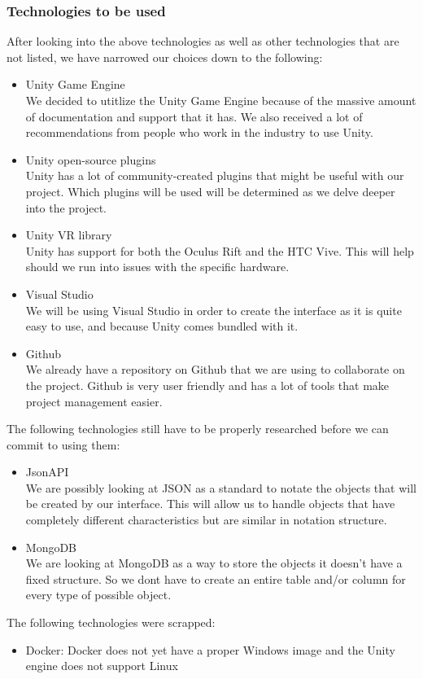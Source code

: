 	\subsubsection{Technologies to be used}
		After looking into the above technologies as well as other technologies that are not listed, we have narrowed our choices down to the following:
		\begin{itemize}
			\item Unity Game Engine \\
			We decided to utitlize the Unity Game Engine because of the massive amount of documentation and support that it has. We also received a lot of recommendations from people who work in the industry to use Unity.\\

			\item Unity open-source plugins \\
			Unity has a lot of community-created plugins that might be useful with our project. Which plugins will be used will be determined as we delve deeper into the project. \\

			\item Unity VR library \\
			Unity has support for both the Oculus Rift and the HTC Vive. This will help should we run into issues with the specific hardware. \\

			\item Visual Studio \\
			We will be using Visual Studio in order to create the interface as it is quite easy to use, and because Unity comes bundled with it. \\

			\item Github \\
			We already have a repository on Github that we are using to collaborate on the project. Github is very user friendly and has a lot of tools that make project management easier.
		\end{itemize}

		The following technologies still have to be properly researched before we can commit to using them:
		\begin{itemize}
			\item JsonAPI \\
			We are possibly looking at JSON as a standard to notate the objects that will be created by our interface. This will allow us to handle objects that have completely different characteristics but are similar in notation structure.\\

			\item MongoDB \\
			We are looking at MongoDB as a way to store the objects it doesn't have a fixed structure. So we dont have to create an entire table and/or column for every type of possible object. \\
		\end{itemize}


	The following technologies were scrapped:
	\begin{itemize}
		\item Docker: Docker does not yet have a proper Windows image and the Unity engine does not support Linux
	\end{itemize}
